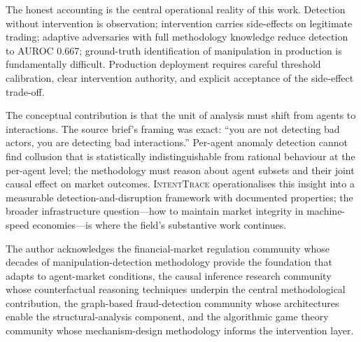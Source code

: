 \documentclass[sigconf,nonacm]{acmart}
\begin{document}
The honest accounting is the central operational reality of this
work. Detection without intervention is observation; intervention
carries side-effects on legitimate trading; adaptive adversaries
with full methodology knowledge reduce detection to AUROC 0.667;
ground-truth identification of manipulation in production is
fundamentally difficult. Production deployment requires careful
threshold calibration, clear intervention authority, and
explicit acceptance of the side-effect trade-off.

The conceptual contribution is that the unit of analysis must
shift from agents to interactions. The source brief's framing was
exact: ``you are not detecting bad actors, you are detecting bad
interactions.'' Per-agent anomaly detection cannot find collusion
that is statistically indistinguishable from rational behaviour
at the per-agent level; the methodology must reason about agent
subsets and their joint causal effect on market outcomes.
\textsc{IntentTrace} operationalises this insight into a measurable
detection-and-disruption framework with documented properties; the
broader infrastructure question---how to maintain market integrity
in machine-speed economies---is where the field's substantive
work continues.

\begin{acks}
The author acknowledges the financial-market regulation community
whose decades of manipulation-detection methodology provide the
foundation that adapts to agent-market conditions, the causal
inference research community whose counterfactual reasoning
techniques underpin the central methodological contribution, the
graph-based fraud-detection community whose architectures enable
the structural-analysis component, and the algorithmic game theory
community whose mechanism-design methodology informs the
intervention layer.
\end{acks}
\end{document}
